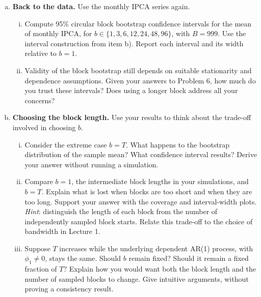\documentclass[11pt]{article}
\theoremstyle{definition}
\begin{document}
\begin{enumerate}[a)]
	\item \textbf{Back to the data.} Use the monthly IPCA series again.
	\begin{enumerate}[(i)]
		\item Compute 95\% circular block bootstrap confidence intervals for the mean of monthly IPCA, for $b \in \{1, 3, 6, 12, 24, 48, 96\}$, with $B = 999$. Use the interval construction from item b). Report each interval and its width relative to $b = 1$.
		\item Validity of the block bootstrap still depends on suitable stationarity and dependence assumptions. Given your answers to Problem 6, how much do you trust these intervals? Does using a longer block address all your concerns?
	\end{enumerate}

	\item \textbf{Choosing the block length.} Use your results to think about the trade-off involved in choosing $b$.
	\begin{enumerate}[(i)]
		\item Consider the extreme case $b = T$. What happens to the bootstrap distribution of the sample mean? What confidence interval results? Derive your answer without running a simulation.
		\item Compare $b = 1$, the intermediate block lengths in your simulations, and $b = T$. Explain what is lost when blocks are too short and when they are too long. Support your answer with the coverage and interval-width plots. \textit{Hint}: distinguish the length of each block from the number of independently sampled block starts. Relate this trade-off to the choice of bandwidth in Lecture 1.
		\item Suppose $T$ increases while the underlying dependent AR(1) process, with $\phi_1 \neq 0$, stays the same. Should $b$ remain fixed? Should it remain a fixed fraction of $T$? Explain how you would want both the block length and the number of sampled blocks to change. Give intuitive arguments, without proving a consistency result.
	\end{enumerate}
\end{enumerate}
\end{document}
